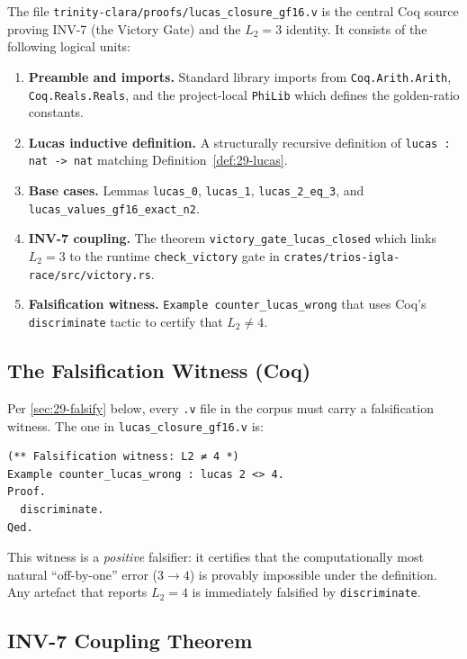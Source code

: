The file \texttt{trinity-clara/proofs/lucas\_closure\_gf16.v} is the
central Coq source proving INV-7 (the Victory Gate) and the $L_2 = 3$
identity.  It consists of the following logical units:

\begin{enumerate}
  \item \textbf{Preamble and imports.}  Standard library imports from
        \texttt{Coq.Arith.Arith}, \texttt{Coq.Reals.Reals}, and the
        project-local \texttt{PhiLib} which defines the golden-ratio
        constants.
  \item \textbf{Lucas inductive definition.}  A structurally recursive
        definition of \texttt{lucas : nat -> nat} matching
        Definition~\ref{def:29-lucas}.
  \item \textbf{Base cases.}  Lemmas \texttt{lucas\_0}, \texttt{lucas\_1},
        \texttt{lucas\_2\_eq\_3}, and \texttt{lucas\_values\_gf16\_exact\_n2}.
  \item \textbf{INV-7 coupling.}  The theorem
        \texttt{victory\_gate\_lucas\_closed} which links $L_2 = 3$ to
        the runtime \texttt{check\_victory} gate in
        \texttt{crates/trios-igla-race/src/victory.rs}.
  \item \textbf{Falsification witness.}  \texttt{Example counter\_lucas\_wrong}
        that uses Coq's \texttt{discriminate} tactic to certify that
        $L_2 \neq 4$.
\end{enumerate}

\subsection{The Falsification Witness (Coq)}

Per \textsection\ref{sec:29-falsify} below, every \texttt{.v} file in
the corpus must carry a falsification witness.  The one in
\texttt{lucas\_closure\_gf16.v} is:

\begin{verbatim}
(** Falsification witness: L2 ≠ 4 *)
Example counter_lucas_wrong : lucas 2 <> 4.
Proof.
  discriminate.
Qed.
\end{verbatim}

This witness is a \emph{positive} falsifier: it certifies that the
computationally most natural ``off-by-one'' error ($3 \to 4$) is
provably impossible under the definition.  Any artefact that reports
$L_2 = 4$ is immediately falsified by \texttt{discriminate}.

\subsection{INV-7 Coupling Theorem}

